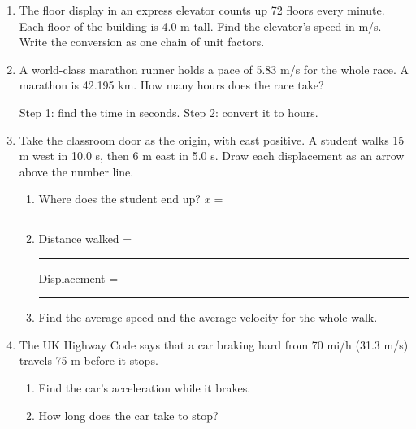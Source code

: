 \documentclass[12pt, twoside]{article}
\newcommand{\blank}[1][2.4cm]{\rule{#1}{0.4pt}}
\begin{document}
\begin{enumerate}[itemsep=0.6cm]

\item The floor display in an express elevator counts up 72 floors every minute.
  Each floor of the building is 4.0 m tall. Find the elevator's speed in m/s.
  Write the conversion as one chain of unit factors.
  \vspace{5.0cm}

\item A world-class marathon runner holds a pace of 5.83 m/s for the whole race. A
  marathon is 42.195 km. How many hours does the race take?

  Step 1: find the time in seconds. \quad Step 2: convert it to hours.

\newpage

\item Take the classroom door as the origin, with east positive. A student walks
  15 m west in 10.0 s, then 6 m east in 5.0 s. Draw each displacement as an arrow
  above the number line.

  \begin{center}
  \end{center}

  \begin{enumerate}[itemsep=0.6cm]
    \item Where does the student end up? \hfill $x = $ \blank
    \item Distance walked = \blank \hfill Displacement = \blank
    \item Find the average speed and the average velocity for the whole walk.
      \vspace{3.5cm}
  \end{enumerate}

\item The UK Highway Code says that a car braking hard from 70 mi/h (31.3 m/s)
  travels 75 m before it stops.
  \begin{enumerate}[itemsep=0.4cm]
    \item Find the car's acceleration while it brakes.
      \vspace{3.8cm}
    \item How long does the car take to stop?
  \end{enumerate}


\end{enumerate}
\end{document}
